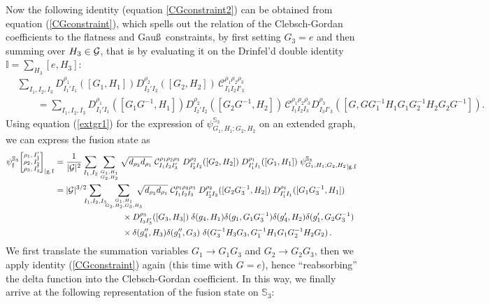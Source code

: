 \documentclass[nofootinbib,superscriptaddress,eqsecnum,tightenlines,11pt]{revtex4-1}
\def\nn{\nonumber}
\def\q{\qquad}
\def\mG{\mathcal{G}}
\renewcommand{\S}{{\mathbb S}}
\begin{document}
Now the following identity (equation \eqref{CGconstraint2}) can be obtained from equation (\ref{CGconstraint}), which spells out the relation of the Clebsch-Gordan coefficients to the flatness and Gau\ss~constraints, by first setting $G_3=e$ and then summing over $H_3 \in {\cal G}$, that is by evaluating it on the Drinfel'd double identity $\mathbb{I} = \sum_{H_3} [e,H_3]$:
\begin{align}\label{CGconstraint2}
	&\sum_{I_1,I_2,I_3} 
	D^{\rho_1}_{I_1'I_1}([G_1,H_1])   D^{\rho_2}_{I_2'I_2}([G_2,H_2]) 
	\,\mathcal{C}^{\rho_1 \rho_2\rho_3}_{I_1 I_2 I'_3}  \\ \nn & \q =
	\sum_{I_1,I_2,I_3} 
	D^{\rho_1}_{I_1'I_1}([G_1G^{-1},H_1])   D^{\rho_2}_{I_2'I_2}([G_2G^{-1},H_2]) 
	\,\mathcal{C}^{\rho_1 \rho_2\rho_3}_{I_1 I_2 I_3}  D^{\rho_3}_{I_3 I'_3}([G ,  G G_1^{-1} H_1 G_1 G_2^{-1} H_2 G_2 G^{-1}]).
\end{align}
Using equation (\ref{extgr1})  for the expression of $\psi^{\S_3}_{G_1,H_1;G_2,H_2}$ on an extended graph, we can express the fusion state as
\begin{align}
\psi^{\S_3}_{\frak f}
	 { \scriptsize\begin{bmatrix} \rho_1,I_1'\\ \rho_2,I_2'\\ \rho_3,I'_3\end{bmatrix}}_{|{\rm g.f}}
	&= \frac{1}{|\mG|^2} \sum_{I_1, I_2} \sum_{G_1,H_1 \atop G_2, H_2} 
	\sqrt{d_{\rho_2} d_{\rho_1} }\;
	\mathcal{C}^{\rho_1 \rho_2\rho_3}_{I_1 I_2 I'_3}\;
	{D^{\rho_2}_{I'_2 I_2 }([G_2,H_2 ])} \;
 	{D^{\rho_1}_{I'_1 I_1}([G_1 ,H_1 ])}\;
	{\psi^{\S_3}_{G_1,H_1;G_2,H_2}}_{|{\rm g.f}} \nn\\
	&=
	|\mG|^{3/2} \!\!\!\sum_{I_1, I_2,I_3}\!\!\! \sum_{G_1,H_1 \atop G_2, H_2,G_3,H_3}\!\!\!\!\!\!
	\sqrt{d_{\rho_2} d_{\rho_1} }\;
	\mathcal{C}^{\rho_1 \rho_2\rho_3}_{I_1 I_2 I_3}\;
	{D^{\rho_2}_{I'_2 I_2 }([G_2G_3^{-1},H_2 ])} \;
	{D^{\rho_1}_{I'_1 I_1}([G_1 G_3^{-1} ,H_1 ])}\;  \nn\\  
	& \q\q\q\q \times {D^{\rho_3}_{I_3 I'_3}([G_3 ,H_3 ])}\; 
	\delta(g_4,H_1) \delta(g_1,G_1G_3^{-1}) \delta(g'_4,H_2) \delta(g'_1,G_2G_3^{-1})  \nn\\
	&\q\q\q\q \times  \delta(g''_4,H_3) \delta(g''_1, G_3) \,\,
	\delta(G_3^{-1}H_3G_3, G_1^{-1} H_1 G_1 G_2^{-1} H_2 G_2)\,. \nn\\
\end{align}
We first translate the summation variables $G_1 \rightarrow G_1 G_3$ and $G_2 \rightarrow G_2 G_3$, then we apply identity (\ref{CGconstraint}) again (this time with $G=e$), hence ``reabsorbing'' the delta function into the Clebsch-Gordan coefficient. In this way, we finally arrive at the following representation of the fusion state on ${\mathbb S}_3$:
\end{document}
